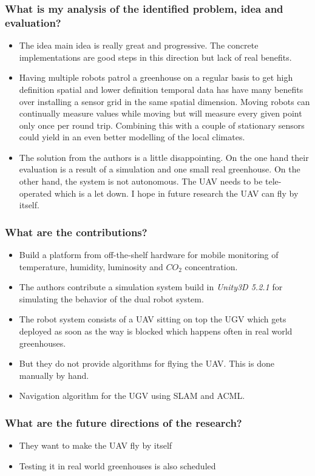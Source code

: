     \subsubsection*{What is my analysis of the identified problem, idea and evaluation?}
    \begin{itemize}
        \item The idea main idea is really great and progressive. The concrete implementations are good steps in this direction but lack of real benefits.
        \item Having multiple robots patrol a greenhouse on a regular basis to get high definition spatial and lower definition temporal data has have many benefits over installing 
        a sensor grid in the same spatial dimension. Moving robots can continually measure values while moving but will measure every given point only once per round trip. Combining this
        with a couple of stationary sensors could yield in an even better modelling of the local climates.
        \item The solution from the authors is a little disappointing. On the one hand their evaluation is a result of a simulation and one small real greenhouse. On the other hand,
        the system is not autonomous. The UAV needs to be tele-operated which is a let down. I hope in future research the UAV can fly by itself.
    \end{itemize}
    \subsubsection*{What are the contributions?}
    \begin{itemize}
        \item Build a platform from off-the-shelf hardware for mobile monitoring of temperature, humidity, luminosity and $CO_2$ concentration.
        \item The authors contribute a simulation system build in \emph{Unity3D 5.2.1} for simulating the behavior of the dual robot system. 
        \item The robot system consists of a UAV sitting on top the UGV which gets deployed as soon as the way is blocked which happens often in real world greenhouses.
        \item But they do not provide algorithms for flying the UAV. This is done manually by hand.
        \item Navigation algorithm for the UGV using SLAM and ACML.
    \end{itemize}
    \subsubsection*{What are the future directions of the research?}
    \begin{itemize}
        \item They want to make the UAV fly by itself
        \item Testing it in real world greenhouses is also scheduled
    \end{itemize}
